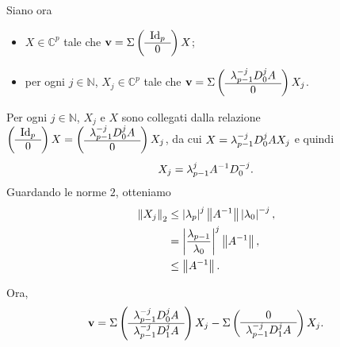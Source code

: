\par Siano ora
\begin{itemize}
  \item $X \in \mathbb{C}^p$ tale che
  $\Vector = 
    \SpectralBaseChange
    \lmatrix
    \begin{array}{c}
      \Identity[p]\\
      \hline
        0
      \end{array}
    \rmatrix X$;
  \item per ogni $j \in \mathbb{N}$, $X_j \in \mathbb{C}^p$ tale che
  $\mathbf{v} = 
    \Sigma
    \left (
    \begin{array}{c}
      \lambda_{p - 1}^{-j} D_0^j A\\
      \hline
        0
      \end{array}
    \right ) X_j$.
\end{itemize}
Per ogni $j \in \mathbb{N}$, $X_j$ e $X$ sono collegati dalla relazione
$\lmatrix
\begin{array}{c}
  \Identity[p]\\
  \hline
  0
\end{array}
\rmatrix X
=
\lmatrix
\begin{array}{c}
  \Eigenvalue_{p - 1}^{-j} \DiagonalMatrix_0^j A\\
  \hline
    0
  \end{array}
\rmatrix X_j$,
da cui
$X = \lambda_{p - 1}^{-j} D_0^j A X_j$
e quindi
\[
  X_j = \lambda_{p - 1}^j A^{-1} D_0^{-j}.
\]
Guardando le norme $2$, otteniamo
\begin{align*}
  \Norm{X_j}[2]
  &\leq \AbsoluteValue{\Eigenvalue_p}^j \Norm{A^{-1}} \AbsoluteValue{\Eigenvalue_0}^{-j},\\
  &= \AbsoluteValue{\frac{\Eigenvalue_{p - 1}}{\Eigenvalue_0}}^j \Norm{A^{-1}},\\
  &\leq \Norm{A^{-1}}.
\end{align*}
\par Ora,
\[
  \mathbf{v} = 
  \Sigma
  \left (
  \begin{array}{c}
    \lambda_{p - 1}^{-j} D_0^j A\\
    \hline
    \lambda_{p - 1}^{-j} D_1^j A
  \end{array}
  \right )
  X_j
  - \Sigma
  \left (
  \begin{array}{c}
    0\\
    \hline
    \lambda_{p - 1}^{-j} D_1^j A
  \end{array}
  \right )
  X_j.
\]
